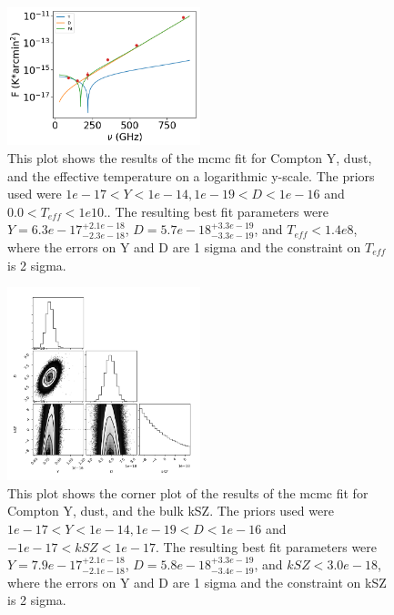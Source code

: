 \documentclass{princeton_astro_thesis}
\begin{document}
\begin{figure}[h]
\centering
\includegraphics[width=0.5\textwidth]{../redmapper_apfluxes_Tefffitlog.png}
\caption{This plot shows  the results of the mcmc fit for Compton Y, dust, and the effective temperature on a logarithmic y-scale. The priors used were $ 1e-17 < Y < 1e-14, 1e-19< D < 1e-16$ and $0.0 < T_{eff} <1e10.$. The resulting best fit parameters were $Y=6.3e-17^{+2.1e-18}_{-2.3e-18}$, $D=5.7e-18^{+3.3e-19}_{-3.3e-19}$, and $T_{eff}<1.4e8$, where the errors on Y and D are 1 sigma and the constraint on $T_{eff}$ is 2 sigma.}
\end{figure}

\begin{figure}[h]
\centering
\includegraphics[width=0.5\textwidth]{../BulkkSZplot.png}
\caption{This plot shows the corner plot of the results of the mcmc fit for Compton Y, dust, and the bulk kSZ. The priors used were $ 1e-17 < Y < 1e-14, 1e-19< D < 1e-16$ and $-1e-17 < kSZ <1e-17.$ The resulting best fit parameters were $Y=7.9e-17^{+2.1e-18}_{-2.1e-18}$, $D=5.8e-18^{+3.3e-19}_{-3.4e-19}$, and $kSZ<3.0e-18$, where the errors on Y and D are 1 sigma and the constraint on kSZ is 2 sigma.}
\end{figure}
\end{document}
